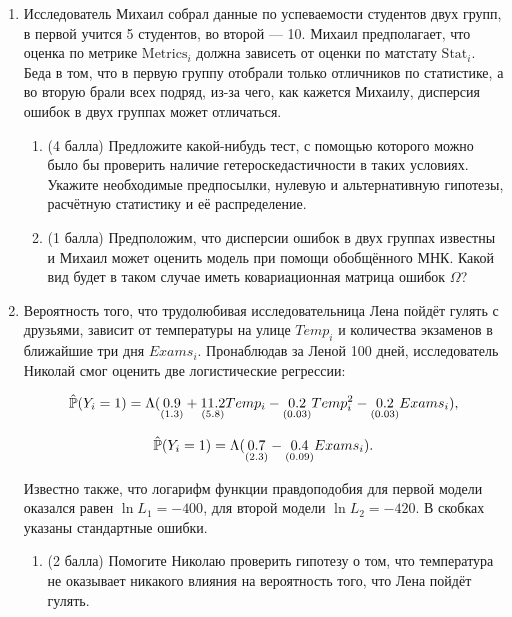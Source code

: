 \begin{enumerate}
\item %

Исследователь Михаил собрал данные по успеваемости студентов двух групп, в первой учится 5 студентов, во второй — 10. Михаил предполагает, что оценка по метрике $\text{Metrics}_i$ должна зависеть от оценки по матстату $\text{Stat}_i$. Беда в том, что в первую группу отобрали только отличников по статистике, а во вторую брали всех подряд, из-за чего, как кажется Михаилу, дисперсия ошибок в двух группах может отличаться. 

\begin{enumerate}
    \item (4 балла) Предложите какой-нибудь тест, с помощью которого можно было бы проверить наличие гетероскедастичности в таких условиях. Укажите необходимые предпосылки, нулевую и альтернативную гипотезы, расчётную статистику и её распределение. 
    
    \item (1 балла) Предположим, что дисперсии ошибок в двух группах известны и Михаил может оценить модель при помощи обобщённого МНК. Какой вид будет в таком случае иметь ковариационная матрица ошибок $\Omega$?
    
\end{enumerate}


\newpage
\item %

Вероятность того, что трудолюбивая исследовательница Лена пойдёт гулять с друзьями, зависит от температуры на улице $Temp_i$ и количества экзаменов в ближайшие три дня $Exams_i$. Пронаблюдав за Леной 100 дней, исследователь Николай смог оценить две логистические регрессии:

\[
\hat \P(Y_i = 1) = \Lambda( \underset{(1.3)}{0.9} + \underset{(5.8)}{11.2} Temp_i - \underset{(0.03)}{0.2} Temp_i^2 - \underset{(0.03)}{0.2} Exams_i ),
\]

\[
\hat \P(Y_i = 1) = \Lambda( \underset{(2.3)}{0.7} - \underset{(0.09)}{0.4} Exams_i ).
\]

Известно также, что логарифм функции правдоподобия для первой модели оказался равен $\ln L_1 = -400$, для второй модели $\ln L_2 = -420$. 
В скобках указаны стандартные ошибки.

\begin{enumerate}
    \item (2 балла) Помогите Николаю проверить гипотезу о том, что температура не оказывает никакого влияния на вероятность того, что Лена пойдёт гулять.
    

\end{enumerate}
\end{enumerate}
